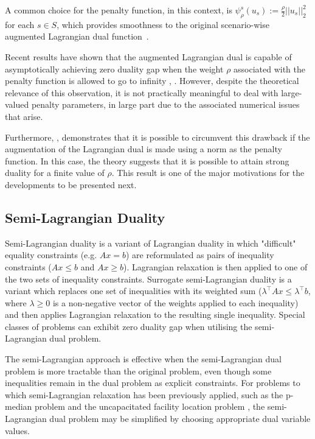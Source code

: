 \documentclass[preprint, 1p, review]{elsarticle}
\begin{document}
A common choice for  the penalty function, in this context, is $\psi_\rho^s(u_s) := \frac{\rho}{2} ||u_s||_2^2$ for each $s \in S$, which provides smoothness to the original scenario-wise augmented Lagrangian dual function~\cite{Rockafellar1976MO,Bertsekas1982,Bertsekas1999}.  

Recent results have shown that the augmented Lagrangian dual is capable of asymptotically achieving zero duality gap when the weight $\rho$ associated with the penalty function is allowed to go to infinity \cite[Prop. 3]{BolandEberhardetal2015}, \cite[Prop. 2 ]{Feizollahi2016}. However, despite the theoretical relevance of this observation, it is not practically meaningful to deal with large-valued penalty parameters, in large part due to the associated numerical issues that arise. 

Furthermore, \cite[Cor. 1]{BolandEberhardetal2015}, \cite[Thm. 4 ]{Feizollahi2016} demonstrates that it is possible to circumvent this drawback if the augmentation of the Lagrangian dual is made using a norm as the penalty function. In this case, the theory suggests that it is possible to attain strong duality for a finite value of $\rho$. This result is one of the major motivations for the developments to be presented next.

\subsection{Semi-Lagrangian Duality}

Semi-Lagrangian duality \cite{BeltranSemiL2006} is a variant of Lagrangian duality in which "difficult" equality constraints (e.g. $Ax = b$) are reformulated as pairs of inequality constraints ($Ax \leq b$ and $Ax \geq b$). Lagrangian relaxation is then applied to one of the two sets of inequality constraints. Surrogate semi-Lagrangian duality \cite{MonabbatiSemiL2014,JornstenSemiL2015} is a variant which replaces one set of inequalities with its weighted sum ($\lambda^\top Ax \leq \lambda^\top b$, where $\lambda \geq 0$ is a non-negative vector of the weights applied to each inequality) and then applies Lagrangian relaxation to the resulting single inequality. Special classes of problems can exhibit zero duality gap when utilising the semi-Lagrangian dual problem.

The semi-Lagrangian approach is effective when the semi-Lagrangian dual problem is more tractable than the original problem, even though some inequalities remain in the dual problem as explicit constraints. For problems to which semi-Lagrangian relaxation has been previously applied, such as the  p-median problem \cite{BeltranSemiL2006} and the uncapacitated facility location problem  \cite{BeltranRoyoSL_UCAP2012}, the semi-Lagrangian dual problem may be simplified by choosing appropriate dual variable values. 
\end{document}
